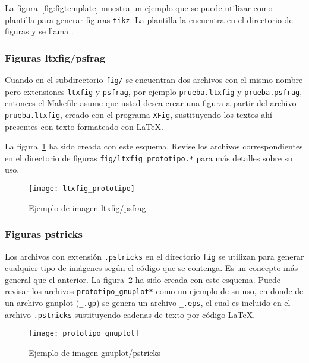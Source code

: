 La figura~\ref{fig:figtemplate} muestra un ejemplo que se puede
utilizar como plantilla para generar figuras \texttt{tikz}.  La
plantilla la encuentra en el directorio de figuras y se llama
.


\subsubsection{Figuras ltxfig/psfrag}

Cuando en el subdirectorio \texttt{fig/} se encuentran dos archivos con el
mismo nombre pero extensiones \texttt{ltxfig} y \texttt{psfrag}, por ejemplo
\texttt{prueba.ltxfig} y \texttt{prueba.psfrag}, entonces el Makefile asume que
usted desea crear una figura a partir del archivo \texttt{prueba.ltxfig},
creado con el programa \texttt{XFig}, sustituyendo los textos ahí presentes con
texto formateado con LaTeX.

La figura~\ref{fig:ltxfig} ha sido creada con este esquema.  Revise los
archivos correspondientes en el directorio de figuras
\texttt{fig/ltxfig\_prototipo.*} para más detalles sobre su uso.

\begin{figure}[htb]
  \centering
  \texttt{[image: ltxfig\_prototipo]}
  \caption{Ejemplo de imagen ltxfig/psfrag}
  \label{fig:ltxfig}
\end{figure}

\subsubsection{Figuras pstricks}  

Los archivos con extensión \texttt{.pstricks} en el directorio \texttt{fig} se
utilizan para generar cualquier tipo de imágenes según el código que se
contenga.  Es un concepto más general que el anterior.  La
figura~\ref{fig:pstricks} ha sido creada con este esquema.  Puede revisar los
archivos \texttt{prototipo\_gnuplot*} como un ejemplo de su uso, en donde de un
archivo gnuplot (\texttt{\_.gp}) se genera un archivo \texttt{\_.eps}, el cual
es incluido en el archivo \texttt{.pstricks} sustituyendo cadenas de texto por
código LaTeX.

\begin{figure}[htb]
  \centering
  \texttt{[image: prototipo\_gnuplot]}
  \caption{Ejemplo de imagen gnuplot/pstricks}
  \label{fig:pstricks}
\end{figure}



